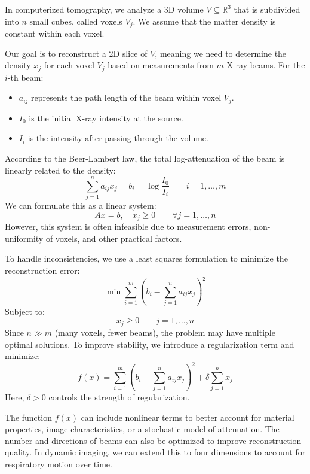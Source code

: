 \begin{example}
    In computerized tomography, we analyze a 3D volume $V\subseteq\mathbb{R}^{3}$ that is subdivided into $n$ small cubes, called voxels $V_j$.
    We assume that the matter density is constant within each voxel.

    Our goal is to reconstruct a 2D slice of $V$, meaning we need to determine the density $x_j$ for each voxel $V_j$  based on measurements from $m$ X-ray beams.
    For the $i$-th beam:
    \begin{itemize}
        \item $a_{ij}$ represents the path length of the beam within voxel $V_j$. 
        \item $I_0$ is the initial X-ray intensity at the source.
        \item $I_i$ is the intensity after passing through the volume.
    \end{itemize}
    According to the Beer-Lambert law, the total log-attenuation of the beam is linearly related to the density:
    \[\sum_{j=1}^{n}a_{ij}x_j=b_i=\log\dfrac{I_0}{I_i} \qquad i=1,\dots,m\]
    We can formulate this as a linear system:
    \[Ax=b, \quad x_j\geq 0 \qquad \forall j=1,\dots,n\]
    However, this system is often infeasible due to measurement errors, non-uniformity of voxels, and other practical factors.

    To handle inconsistencies, we use a least squares formulation to minimize the reconstruction error:
    \[\min\sum_{i=1}^{m}\left(b_i-\sum_{j=1}^{n}a_{ij}x_{j}\right)^2\]
    Subject to: 
    \[x_j\geq 0 \qquad j=1,\dots,n\]
    Since $n\gg m$ (many voxels, fewer beams), the problem may have multiple optimal solutions. 
    To improve stability, we introduce a regularization term and minimize:
    \[f(x)=\sum_{i=1}^{m}\left(b_i-\sum_{j=1}^{n}a_{ij}x_{j}\right)^2+\delta\sum_{j=1}^{n}x_j\]
    Here, $\delta>0$ controls the strength of regularization.

    The function $f(x)$ can include nonlinear terms to better account for material properties, image characteristics, or a stochastic model of attenuation. 
    The number and directions of beams can also be optimized to improve reconstruction quality.
    In dynamic imaging, we can extend this to four dimensions to account for respiratory motion over time.
\end{example}

